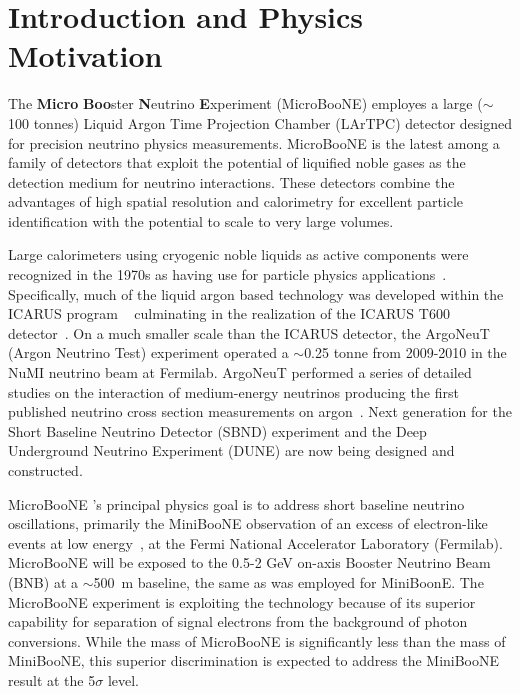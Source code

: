 \section{Introduction and Physics Motivation}

The {\bf{Micro}} {\bf{Boo}}ster {\bf{N}}eutrino {\bf{E}}xperiment (MicroBooNE) employes a large ($\sim$100 tonnes) Liquid Argon Time Projection Chamber (LArTPC) detector designed for precision neutrino physics measurements.   MicroBooNE is the latest among a family of detectors that exploit the potential of liquified noble gases as the detection medium for neutrino interactions.   These detectors combine the advantages of high spatial resolution and calorimetry for excellent particle identification with the potential to scale to very large volumes. 

Large calorimeters using cryogenic noble liquids as active components were recognized in the 1970s as having use for particle physics applications~\cite{Willis:1974}.  Specifically, much of the liquid argon based technology was developed within the ICARUS program ~\cite{Benetti:1993-3ton,Cennini:1994-3ton,Arneodo:1999-50l} culminating in the realization of the ICARUS T600 detector~\cite{Amerio:2004-T600}.  On a much smaller scale than the ICARUS detector, the ArgoNeuT (Argon Neutrino Test) experiment operated a $\sim$0.25 tonne \lartpc from 2009-2010 in the NuMI neutrino beam at Fermilab.   ArgoNeuT performed a series of detailed studies on the interaction of medium-energy neutrinos \cite{Acciarri:2013-argoneut-recomb}  producing the first published neutrino cross section measurements on argon~\cite{Anderson:2012-argoneut-CCincl,Acciarri:2014-argoneut-CCxsec,Acciarri:2014eit}.   Next generation \lartpcs for the Short Baseline Neutrino Detector (SBND) experiment and the Deep Underground Neutrino Experiment (DUNE) are now being designed and constructed.   
   
MicroBooNE 's principal physics goal is to address short baseline neutrino oscillations, primarily the MiniBooNE observation of an excess of electron-like events at low energy~\cite{AguilarArevalo:2008rc}, at the Fermi National Accelerator Laboratory (Fermilab).  MicroBooNE will be exposed to the  0.5-2 GeV on-axis Booster Neutrino Beam (BNB) at a $\sim$500~m baseline, the same as was employed for MiniBoonE.  The MicroBooNE experiment is exploiting the \lartpc technology because of its superior capability for separation of signal electrons from the background of photon conversions.   While the mass of MicroBooNE is significantly less than the mass of MiniBooNE, this superior discrimination is expected to address the MiniBooNE result at the 5$\sigma$ level.   

